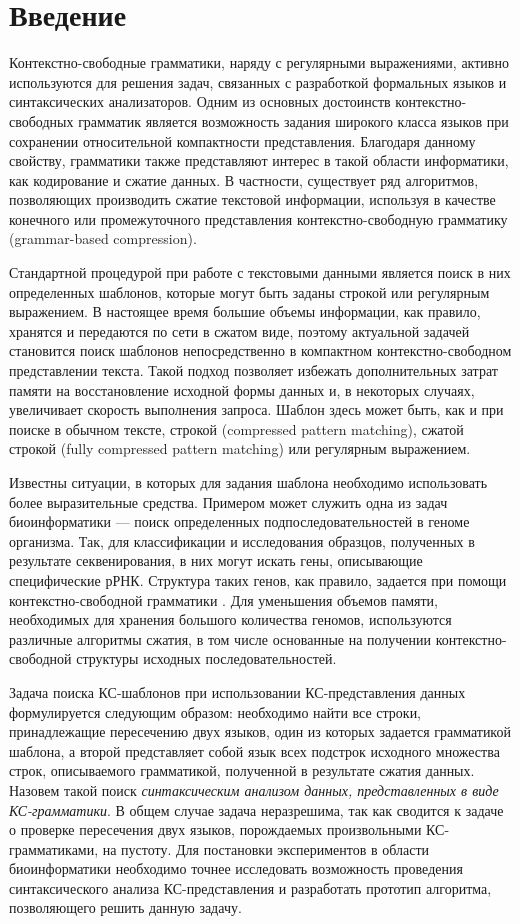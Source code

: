 \section*{Введение}

Контекстно-свободные грамматики, наряду с регулярными выражениями, активно используются для решения задач, связанных с разработкой формальных языков и синтаксических анализаторов. 
Одним из основных достоинств контекстно-свободных грамматик является возможность задания широкого класса языков при сохранении относительной компактности представления. 
Благодаря данному свойству, грамматики также представляют интерес в такой области информатики, как кодирование и сжатие данных. 
В частности, существует ряд алгоритмов, позволяющих производить сжатие текстовой информации, используя в качестве конечного \cite{Sequitur} или промежуточного \cite{Arimura} представления контекстно-свободную грамматику (grammar-based compression). 

Стандартной процедурой при работе с текстовыми данными является поиск в них определенных шаблонов, которые могут быть заданы строкой или регулярным выражением. 
В настоящее время большие объемы информации, как правило, хранятся и передаются по сети в сжатом виде, поэтому актуальной задачей становится поиск шаблонов непосредственно в компактном контекстно-свободном представлении текста.
Такой подход позволяет избежать дополнительных затрат памяти на восстановление исходной формы данных и, в некоторых случаях, увеличивает скорость выполнения запроса.
Шаблон здесь может быть, как и при поиске в обычном тексте, строкой (compressed pattern matching), сжатой строкой (fully compressed pattern matching) или регулярным выражением.

Известны ситуации, в которых для задания шаблона необходимо использовать более выразительные средства. 
Примером может служить одна из задач биоинформатики --- поиск определенных подпоследовательностей в геноме организма. Так, для классификации и исследования образцов, полученных в результате секвенирования, в них могут искать гены, описывающие специфические рРНК. Структура таких генов, как правило, задается при помощи контекстно-свободной грамматики \cite{Anderson2013}. Для уменьшения объемов памяти, необходимых для хранения большого количества геномов, используются различные алгоритмы сжатия, в том числе основанные на получении контекстно-свободной структуры исходных последовательностей.

Задача поиска КС-шаблонов при использовании КС-представления данных формулируется следующим образом: необходимо найти все строки, принадлежащие пересечению двух языков, один из которых задается грамматикой шаблона, а второй представляет собой язык всех подстрок исходного множества строк, описываемого грамматикой, полученной в результате сжатия данных.
Назовем такой поиск \textit{синтаксическим анализом данных, представленных в виде КС-грамматики}.
В общем случае задача неразрешима, так как сводится к задаче о проверке пересечения двух языков, порождаемых произвольными КС-грамматиками, на пустоту. 
Для постановки экспериментов в области биоинформатики необходимо точнее исследовать возможность проведения синтаксического анализа КС-представления и разработать прототип алгоритма, позволяющего решить данную задачу.